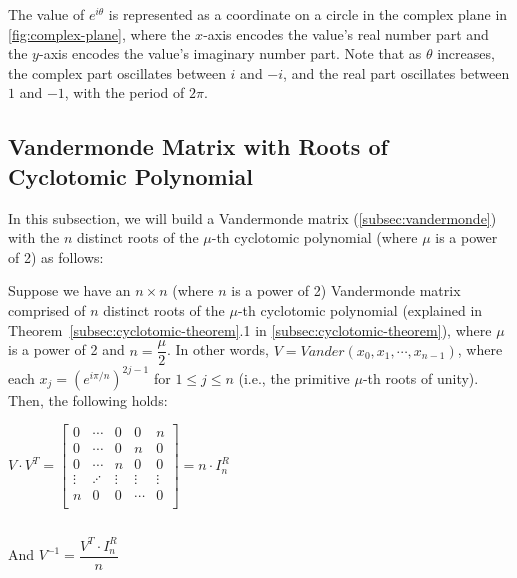 The value of $e^{i\theta}$ is represented as a coordinate on a circle in the complex plane in \autoref{fig:complex-plane}, where the $x$-axis encodes the value's real number part and the $y$-axis encodes the value's imaginary number part. Note that as $\theta$ increases, the complex part oscillates between $i$ and $-i$, and the real part oscillates between $1$ and $-1$, with the period of $2\pi$. 


\subsection{Vandermonde Matrix with Roots of Cyclotomic Polynomial}
\label{subsec:vandermonde-euler}

 
 
In this subsection, we will build a Vandermonde matrix (\autoref{subsec:vandermonde}) with the $n$ distinct roots of the $\mu$-th cyclotomic polynomial (where $\mu$ is a power of 2) as follows:



\begin{tcolorbox}[title={\textbf{\tboxtheorem{\ref*{subsec:vandermonde-euler}} Vandermonde Matrix with the Roots of  \text{(power-of-2)}-th Cyclotomic Polynomial}}]

Suppose we have an $n \times n$ (where $n$ is a power of 2) Vandermonde matrix comprised of $n$ distinct roots of the $\mu$-th cyclotomic polynomial (explained in Theorem~\ref*{subsec:cyclotomic-theorem}.1 in \autoref{subsec:cyclotomic-theorem}), where $\mu$ is a power of 2 and $n = \dfrac{\mu}{2}$. In other words, $V = \mathit{Vander}(x_0, x_1, \cdots, x_{n-1})$, where each $x_j = (e^{i\pi/n})^{2j-1}$ for $1 \leq j \leq n$ (i.e., the primitive $\mu$-th roots of unity). Then, the following holds:

$V \cdot V^T = \begin{bmatrix}
0 & \cdots & 0 & 0 & n\\
0 & \cdots & 0 & n & 0\\
0 & \cdots & n & 0 & 0\\
\vdots & \iddots & \vdots & \vdots & \vdots \\
n & 0 & 0 & \cdots & 0\\
\end{bmatrix} = n \cdot I^R_n$

$ $

And $V^{-1} = \dfrac{V^T \cdot I_n^R}{n}$


\end{tcolorbox}

